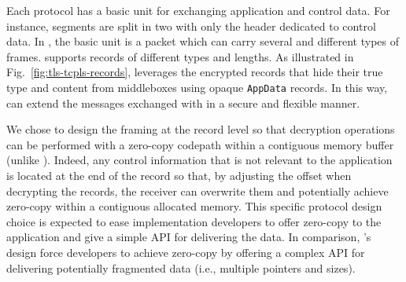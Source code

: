Each protocol has a basic unit for exchanging application and control data.
For instance, \tcp segments are split in two with only the header dedicated to
control data. In \quic, the basic unit is a \quic packet which can carry several
and different types of \quic frames. \tls supports \tls records of different
types and lengths.  As illustrated in Fig.~\ref{fig:tls-tcpls-records}, \tcpls
leverages the \tls encrypted records that hide their true type and content from
middleboxes using opaque \texttt{AppData} records. In this way, \tcpls can extend the messages exchanged with \tls in a secure and flexible manner.

We chose to design the \tcpls framing at the \tls record level so that
decryption operations can be performed with a zero-copy codepath within a
contiguous memory buffer (unlike \quic). Indeed, any \tcpls control information
that is not relevant to the application is
located at the end of the record so that, by adjusting the offset when
decrypting the \tcpls records, the receiver can overwrite them and potentially
achieve zero-copy within a contiguous allocated memory. This specific protocol
design choice is expected to ease \tcpls implementation developers to offer
zero-copy to the application and give a simple API for delivering the data. In
comparison, \quic's design force developers to achieve zero-copy by offering a
complex API for delivering potentially fragmented data (i.e., multiple pointers
and sizes).


